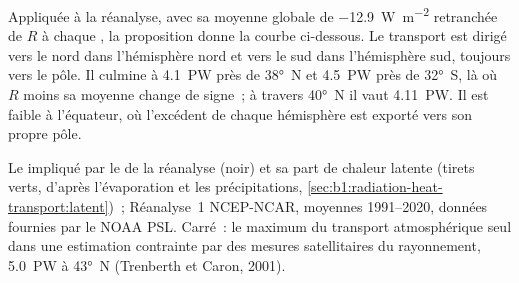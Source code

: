 Appliquée à la réanalyse, avec sa moyenne globale de \qty{-12.9}{W.m^{-2}} retranchée
de $R$ à chaque , la proposition donne la courbe ci-dessous. Le transport est
dirigé vers le nord dans l'hémisphère nord et vers le sud dans l'hémisphère sud, toujours
vers le pôle. Il culmine à \qty{4.1}{PW} près de \ang{38}~N et \qty{4.5}{PW} près de
\ang{32}~S, là où $R$ moins sa moyenne change de signe~; à travers \ang{40}~N il vaut
\qty{4.11}{PW}. Il est faible à l'équateur, où l'excédent de chaque hémisphère
est exporté vers son propre pôle.

\begin{omfigure}

{\small Le  impliqué par le  de la réanalyse
(noir) et sa part de chaleur latente (tirets verts, d'après l'évaporation et les
précipitations, \cref{sec:b1:radiation-heat-transport:latent})~; Réanalyse~1
NCEP-NCAR, moyennes 1991--2020, données fournies par le NOAA PSL. Carré~: le maximum du
transport atmosphérique seul dans une estimation contrainte par des mesures satellitaires
du rayonnement, \qty{5.0}{PW} à \ang{43}~N (Trenberth et Caron,
2001).}
\label{fig:b1:radiation-heat-transport:transport}
\end{omfigure}

